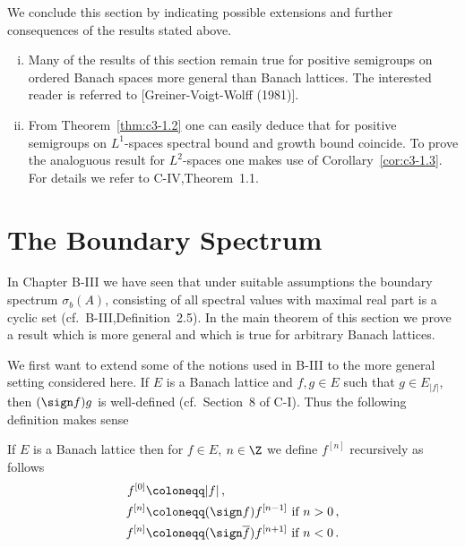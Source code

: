 We conclude this section by indicating possible extensions and further consequences of the results stated above.

\begin{remarks}\label{rem:c3-1.7}
\begin{enumerate}[(i), wide]
	\item 
	Many of the results of this section remain true for positive semigroups on ordered Banach spaces more general than Banach lattices.
	The interested reader is referred to [Greiner-Voigt-Wolff (1981)].
	
	\item 
	From Theorem~\ref{thm:c3-1.2} one can easily deduce that for positive semigroups on $L^1$-spaces spectral bound and growth bound coincide.
	To prove the analoguous result for $L^2$-spaces one makes use of Corollary~\ref{cor:c3-1.3}.
	For details we refer to C-IV,Theorem~1.1.
\end{enumerate}
\end{remarks}
%
\section{The Boundary Spectrum}\label{sec:c3-2}

In Chapter B-III we have seen that under suitable assumptions the boundary spectrum $\sigma_{b}(A)$, consisting of all spectral values with maximal real part is a cyclic set (cf.\ B-III,Definition~2.5).
In the main theorem of this section we prove a result which is more general and which is true for arbitrary Banach lattices.

We first want to extend some of the notions used in B-III to the more general setting considered here.
If $E$ is a Banach lattice and $f,g \in E$ such that $g \in E_{|f|}$, then $(\sign  f)g$ is well-defined (cf.\ Section~8 of C-I).
Thus the following definition makes sense
\begin{definition}\label{def:c3-2.1}
	If $E$ is a Banach lattice then for $f \in E$, $n \in \Z$ we define $f^{[n]}$ recursively as follows
	\begin{equation}\label{eq:c3-2.1}
	\begin{aligned}
		f^{[0]} &\coloneqq |f|\,, \\
		f^{[n]} &\coloneqq (\sign  f)f^{[n-1]} \text{ if } n > 0\,,\\
		f^{[n]} &\coloneqq (\sign  \overline{f})f^{[n+1]} \text{ if } n < 0\,.
	\end{aligned}
	\end{equation}
\end{definition}

